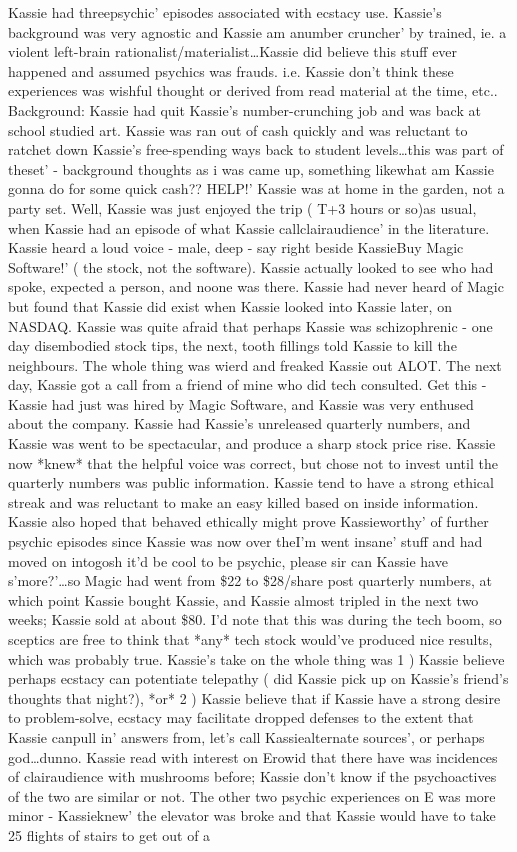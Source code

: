 \documentclass[12pt]{book}
\begin{document}
Kassie had threepsychic' episodes associated with ecstacy use. Kassie's background was very agnostic and Kassie am anumber cruncher' by trained, ie. a violent left-brain rationalist/materialist\ldots Kassie did believe this stuff ever happened and assumed psychics was frauds. i.e. Kassie don't think these experiences was wishful thought or derived from read material at the time, etc.. Background: Kassie had quit Kassie's number-crunching job and was back at school studied art. Kassie was ran out of cash quickly and was reluctant to ratchet down Kassie's free-spending ways back to student levels\ldots this was part of theset' - background thoughts as i was came up, something likewhat am Kassie gonna do for some quick cash?? HELP!' Kassie was at home in the garden, not a party set. Well, Kassie was just enjoyed the trip ( T+3 hours or so)as usual, when Kassie had an episode of what Kassie callclairaudience' in the literature. Kassie heard a loud voice - male, deep - say right beside KassieBuy Magic Software!' ( the stock, not the software). Kassie actually looked to see who had spoke, expected a person, and noone was there. Kassie had never heard of Magic but found that Kassie did exist when Kassie looked into Kassie later, on NASDAQ. Kassie was quite afraid that perhaps Kassie was schizophrenic - one day disembodied stock tips, the next, tooth fillings told Kassie to kill the neighbours. The whole thing was wierd and freaked Kassie out ALOT. The next day, Kassie got a call from a friend of mine who did tech consulted. Get this - Kassie had just was hired by Magic Software, and Kassie was very enthused about the company. Kassie had Kassie's unreleased quarterly numbers, and Kassie was went to be spectacular, and produce a sharp stock price rise. Kassie now *knew* that the helpful voice was correct, but chose not to invest until the quarterly numbers was public information. Kassie tend to have a strong ethical streak and was reluctant to make an easy killed based on inside information. Kassie also hoped that behaved ethically might prove Kassieworthy' of further psychic episodes since Kassie was now over theI'm went insane' stuff and had moved on intogosh it'd be cool to be psychic, please sir can Kassie have s'more?'\ldots so Magic had went from \$22 to \$28/share post quarterly numbers, at which point Kassie bought Kassie, and Kassie almost tripled in the next two weeks; Kassie sold at about \$80. I'd note that this was during the tech boom, so sceptics are free to think that *any* tech stock would've produced nice results, which was probably true. Kassie's take on the whole thing was 1 ) Kassie believe perhaps ecstacy can potentiate telepathy ( did Kassie pick up on Kassie's friend's thoughts that night?), *or* 2 ) Kassie believe that if Kassie have a strong desire to problem-solve, ecstacy may facilitate dropped defenses to the extent that Kassie canpull in' answers from, let's call Kassiealternate sources', or perhaps god\ldots dunno. Kassie read with interest on Erowid that there have was incidences of clairaudience with mushrooms before; Kassie don't know if the psychoactives of the two are similar or not. The other two psychic experiences on E was more minor - Kassieknew' the elevator was broke and that Kassie would have to take 25 flights of stairs to get out of a 
\end{document}
